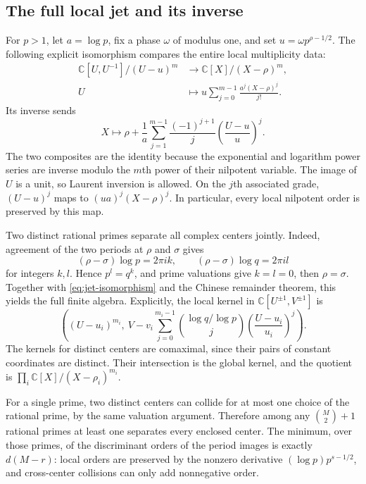 \subsection{The full local jet and its inverse}
For $p>1$, let $a=\log p$, fix a phase $\omega$ of modulus one, and set $u=\omega p^{\rho-1/2}$. The following explicit isomorphism compares the entire local multiplicity data:
\begin{equation}\label{eq:jet-isomorphism}
 \begin{split}
 \mathbb C[U,U^{-1}]/(U-u)^m&\longrightarrow
                 \mathbb C[X]/(X-\rho)^m,\\
 U&\longmapsto u\sum_{j=0}^{m-1}\frac{a^j(X-\rho)^j}{j!}.
 \end{split}
\end{equation}
Its inverse sends
\[
 X\longmapsto\rho+\frac1a\sum_{j=1}^{m-1}
       \frac{(-1)^{j+1}}j\left(\frac{U-u}{u}\right)^j.
\]
The two composites are the identity because the exponential and logarithm power series are inverse modulo the $m$th power of their nilpotent variable. The image of $U$ is a unit, so Laurent inversion is allowed. On the $j$th associated grade, $(U-u)^j$ maps to $(ua)^j(X-\rho)^j$. In particular, every local nilpotent order is preserved by this map.

Two distinct rational primes separate all complex centers jointly. Indeed, agreement of the two periods at $\rho$ and $\sigma$ gives
\[
 (\rho-\sigma)\log p=2\pi ik,\qquad
 (\rho-\sigma)\log q=2\pi il
\]
for integers $k,l$. Hence $p^l=q^k$, and prime valuations give $k=l=0$, then $\rho=\sigma$. Together with \eqref{eq:jet-isomorphism} and the Chinese remainder theorem, this yields the full finite algebra. Explicitly, the local kernel in $\mathbb C[U^{\pm1},V^{\pm1}]$ is
\[
 \left((U-u_i)^{m_i},\ V-v_i\sum_{j=0}^{m_i-1}
      \binom{\log q/\log p}{j}\left(\frac{U-u_i}{u_i}\right)^j\right).
\]
The kernels for distinct centers are comaximal, since their pairs of constant coordinates are distinct. Their intersection is the global kernel, and the quotient is $\prod_i\mathbb C[X]/(X-\rho_i)^{m_i}$.

For a single prime, two distinct centers can collide for at most one choice of the rational prime, by the same valuation argument. Therefore among any $\binom M2+1$ rational primes at least one separates every enclosed center. The minimum, over those primes, of the discriminant orders of the period images is exactly $d(M-r)$: local orders are preserved by the nonzero derivative $(\log p)p^{s-1/2}$, and cross-center collisions can only add nonnegative order.

